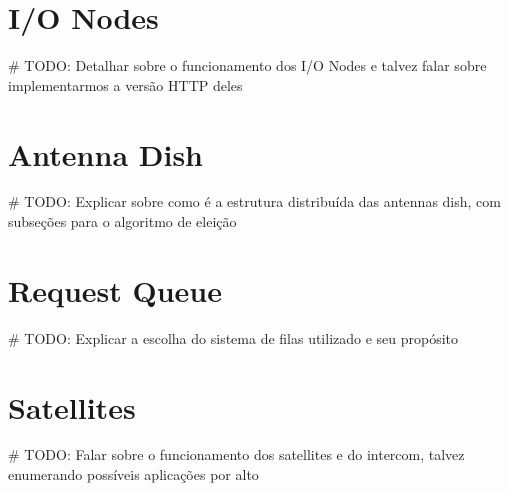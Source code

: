 \section{I/O Nodes}
    {\color{red} \# TODO: Detalhar sobre o funcionamento dos I/O Nodes e talvez falar sobre implementarmos a versão HTTP deles}

\section{Antenna Dish}
    {\color{red} \# TODO: Explicar sobre como é a estrutura distribuída das antennas dish, com subseções para o algoritmo de eleição}

\section{Request Queue}
    {\color{red} \# TODO: Explicar a escolha do sistema de filas utilizado e seu propósito}

\section{Satellites}
    {\color{red} \# TODO: Falar sobre o funcionamento dos satellites e do intercom, talvez enumerando possíveis aplicações por alto}